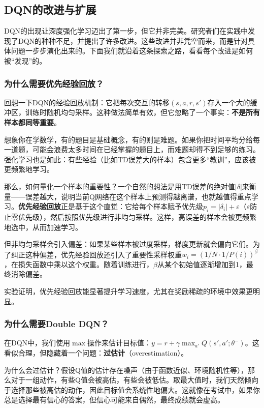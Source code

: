 \documentclass[lang=cn,zihao=-4,a4paper,fontset=windows]{beautybook}
\begin{document}
\subsection{DQN的改进与扩展}

DQN的出现让深度强化学习迈出了第一步，但它并非完美。研究者们在实践中发现了DQN的种种不足，并提出了许多改进。这些改进并非凭空而来，而是针对具体问题一步步演化出来的。下面我们就沿着这条探索之路，看看每个改进是如何被“发现”的。

\subsubsection{为什么需要优先经验回放？}

回想一下DQN的经验回放机制：它把每次交互的转移$(s, a, r, s')$存入一个大的缓冲区，训练时随机均匀采样。这种做法简单有效，但它忽略了一个事实：\textbf{不是所有样本都同等重要}。

想象你在学数学，有的题目是基础概念，有的则是难题。如果你把时间平均分给每一道题，可能会浪费太多时间在已经掌握的题目上，而难题却得不到足够的练习。强化学习也是如此：有些经验（比如TD误差大的样本）包含更多“教训”，应该被更频繁地学习。

那么，如何量化一个样本的重要性？一个自然的想法是用TD误差的绝对值$|\delta|$来衡量——误差越大，说明当前Q网络在这个样本上预测得越离谱，也就越值得重点学习。\textbf{优先经验回放}正是基于这个直觉：它给每个样本赋予优先级$p_i = |\delta_i| + \varepsilon$（$\varepsilon$防止零优先级），然后按照优先级进行非均匀采样。这样，高误差的样本会被更频繁地选中，从而加速学习。

但非均匀采样会引入偏差：如果某些样本被过度采样，梯度更新就会偏向它们。为了纠正这种偏差，优先经验回放还引入了重要性采样权重$w_i = (1/N \cdot 1/P(i))^{\beta}$，在损失函数中乘以这个权重。随着训练进行，$\beta$从某个初始值逐渐增加到1，最终消除偏差。

实验证明，优先经验回放能显著提升学习速度，尤其在奖励稀疏的环境中效果更明显。

\subsubsection{为什么需要Double DQN？}

在DQN中，我们使用$\max$操作来估计目标值：$y = r + \gamma \max_{a'} Q(s', a'; \theta^-)$。这看似合理，但隐藏着一个问题：\textbf{过估计}（overestimation）。

为什么会过估计？假设Q值的估计存在噪声（由于函数近似、环境随机性等），那么对于一组动作，有些Q值会被高估，有些会被低估。取最大值时，我们天然倾向于选择那些被高估的动作，因此目标值会系统性地偏大。这就像在考试中，如果你总是选择最有信心的答案，但信心可能来自偶然，最终成绩就会虚高。
\end{document}
